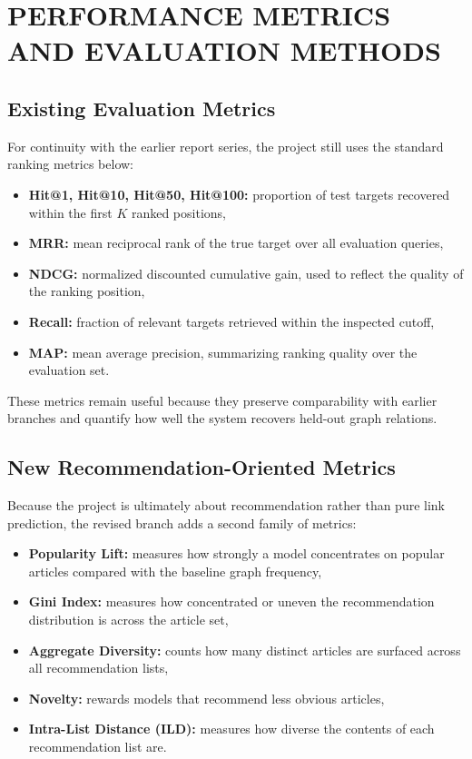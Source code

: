 \chapter{PERFORMANCE METRICS AND EVALUATION METHODS}
\thispagestyle{empty}

\section{Existing Evaluation Metrics}

For continuity with the earlier report series, the project still uses the
standard ranking metrics below:
\begin{itemize}
    \item \textbf{Hit@1, Hit@10, Hit@50, Hit@100:} proportion of test targets
    recovered within the first $K$ ranked positions,
    \item \textbf{MRR:} mean reciprocal rank of the true target over all
    evaluation queries,
    \item \textbf{NDCG:} normalized discounted cumulative gain, used to reflect
    the quality of the ranking position,
    \item \textbf{Recall:} fraction of relevant targets retrieved within the
    inspected cutoff,
    \item \textbf{MAP:} mean average precision, summarizing ranking quality over
    the evaluation set.
\end{itemize}

These metrics remain useful because they preserve comparability with earlier
branches and quantify how well the system recovers held-out graph relations.

\section{New Recommendation-Oriented Metrics}

Because the project is ultimately about recommendation rather than pure link
prediction, the revised branch adds a second family of metrics:
\begin{itemize}
    \item \textbf{Popularity Lift:} measures how strongly a model concentrates
    on popular articles compared with the baseline graph frequency,
    \item \textbf{Gini Index:} measures how concentrated or uneven the
    recommendation distribution is across the article set,
    \item \textbf{Aggregate Diversity:} counts how many distinct articles are
    surfaced across all recommendation lists,
    \item \textbf{Novelty:} rewards models that recommend less obvious articles,
    \item \textbf{Intra-List Distance (ILD):} measures how diverse the contents
    of each recommendation list are.
\end{itemize}

